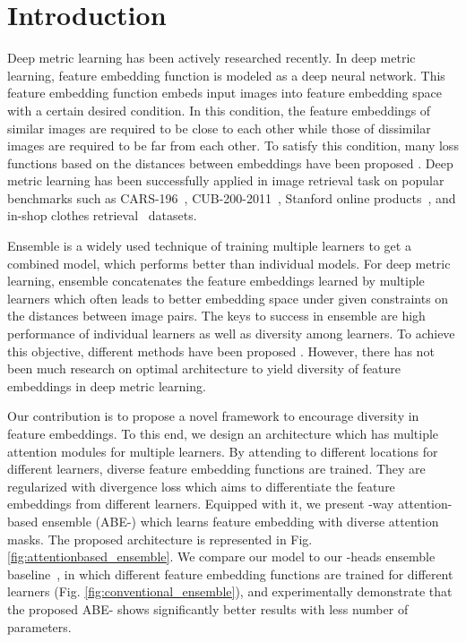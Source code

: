 \documentclass[runningheads]{llncs}
\begin{document}
\vspace{-5mm}
\section{Introduction}
\vspace{-2mm}
Deep metric learning has been actively researched recently.
In deep metric learning, feature embedding function is modeled as a deep neural network.
This feature embedding function embeds input images into feature embedding space with a certain desired condition.
In this condition, the feature embeddings of similar images are required to be close to each other while those of dissimilar images are required to be far from each other.
To satisfy this condition, many loss functions based on the distances between embeddings have been proposed
\cite{bell2015learning,hadsell2006dimensionality,chopra2005learning,weinberger2009distance,schroff2015facenet,oh2016deep,ustinova2016learning,sohn2016improved,song2017deep,law2017deep}.
Deep metric learning has been successfully applied in image retrieval task on popular benchmarks such as CARS-196~\cite{KrauseStarkDengFei-Fei_3DRR2013}, CUB-200-2011~\cite{WahCUB_200_2011}, Stanford online products~\cite{oh2016deep}, and in-shop clothes retrieval~\cite{liu2016deepfashion} datasets.

Ensemble is a widely used technique of training multiple learners to get a combined model, which performs better than individual models.
For deep metric learning, ensemble concatenates the feature embeddings learned by multiple learners which often leads to better embedding space
under given constraints on the distances between image pairs.
The keys to success in ensemble are high performance of individual learners as well as diversity among learners.
To achieve this objective, different methods have been proposed \cite{yuan2016hard,opitz2017bier}.
However, there has not been much research on optimal architecture to yield diversity of feature embeddings in deep metric learning.

Our contribution is to propose a novel framework to encourage diversity in feature embeddings.
To this end, we design an architecture which has multiple attention modules for multiple learners.
By attending to different locations for different learners, diverse feature embedding functions are trained.
They are regularized with divergence loss which aims to differentiate the feature embeddings from different learners.
Equipped with it, we present -way attention-based ensemble (ABE-) which learns feature embedding with  diverse attention masks.
The proposed architecture is represented in Fig. \ref{fig:attentionbased_ensemble}.
We compare our model to our -heads ensemble baseline~\cite{lee2015m}, in which different feature embedding functions are trained for different learners (Fig. \ref{fig:conventional_ensemble}),
and experimentally demonstrate that the proposed ABE- shows significantly better results with less number of parameters.
\end{document}

